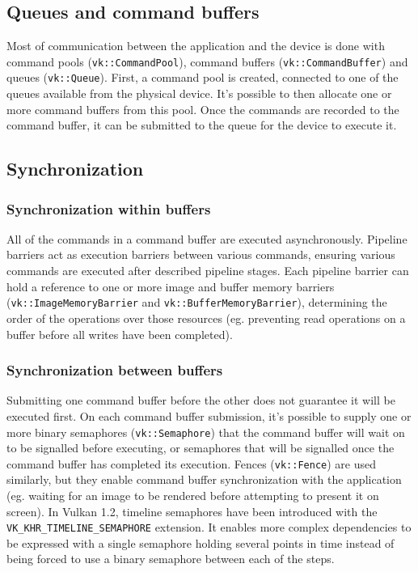 \documentclass[times, utf8, zavrsni, numeric]{fer}
\begin{document}
\subsection{Queues and command buffers}
Most of communication between the application and the device is done with command pools (\texttt{vk::CommandPool}), command buffers (\texttt{vk::CommandBuffer}) and queues (\texttt{vk::Queue}). First, a command pool is created, connected to one of the queues available from the physical device. It's possible to then allocate one or more command buffers from this pool. Once the commands are recorded to the command buffer, it can be submitted to the queue for the device to execute it.

\subsection{Synchronization}
\subsubsection{Synchronization within buffers}
All of the commands in a command buffer are executed asynchronously. Pipeline barriers act as execution barriers between various commands, ensuring various commands are executed after described pipeline stages. Each pipeline barrier can hold a reference to one or more image and buffer memory barriers (\texttt{vk::ImageMemoryBarrier} and \texttt{vk::BufferMemoryBarrier}), determining the order of the operations over those resources (eg. preventing read operations on a buffer before all writes have been completed).

\subsubsection{Synchronization between buffers}
Submitting one command buffer before the other does not guarantee it will be executed first. On each command buffer submission, it's possible to supply one or more binary semaphores (\texttt{vk::Semaphore}) that the command buffer will wait on to be signalled before executing, or semaphores that will be signalled once the command buffer has completed its execution. Fences (\texttt{vk::Fence}) are used similarly, but they enable command buffer synchronization with the application (eg. waiting for an image to be rendered before attempting to present it on screen). In Vulkan 1.2, timeline semaphores have been introduced with the \texttt{VK\_KHR\_TIMELINE\_SEMAPHORE} extension. It enables more complex dependencies to be expressed with a single semaphore holding several points in time instead of being forced to use a binary semaphore between each of the steps.
\end{document}
